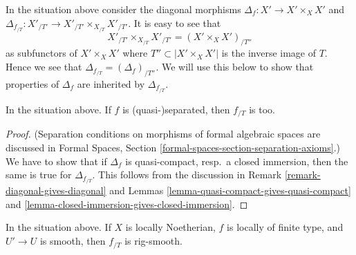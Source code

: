 \begin{remark}
\label{remark-diagonal-gives-diagonal}
In the situation above consider the diagonal morphisms
$\Delta_f : X' \to X' \times_X X'$ and
$\Delta_{f_{/T}} : X'_{/T'} \to X'_{/T'} \times_{X_{/T}} X'_{/T'}$.
It is easy to see that
$$
X'_{/T'} \times_{X_{/T}} X'_{/T'} = (X' \times_X X')_{/T''}
$$
as subfunctors of $X' \times_X X'$ where $T'' \subset |X' \times_X X'|$
is the inverse image of $T$. Hence we see that
$\Delta_{f_{/T}} = (\Delta_f)_{/T''}$. We will use this below
to show that properties of $\Delta_f$ are inherited by $\Delta_{f_{/T}}$.
\end{remark}

\begin{lemma}
\label{lemma-quasi-separated-gives-quasi-separated}
In the situation above. If $f$ is (quasi-)separated, then
$f_{/T}$ is too.
\end{lemma}

\begin{proof}
(Separation conditions on morphisms of formal algebraic spaces are discussed in
Formal Spaces, Section
\ref{formal-spaces-section-separation-axioms}.)
We have to show that if $\Delta_f$ is quasi-compact, resp.\ a closed immersion,
then the same is true for $\Delta_{f_{/T}}$. This follows from the discussion
in Remark \ref{remark-diagonal-gives-diagonal} and
Lemmas \ref{lemma-quasi-compact-gives-quasi-compact} and
\ref{lemma-closed-immersion-gives-closed-immersion}.
\end{proof}

\begin{lemma}
\label{lemma-smooth-gives-rig-smooth}
In the situation above. If $X$ is locally Noetherian,
$f$ is locally of finite type, and $U' \to U$ is smooth, then
$f_{/T}$ is rig-smooth.
\end{lemma}

